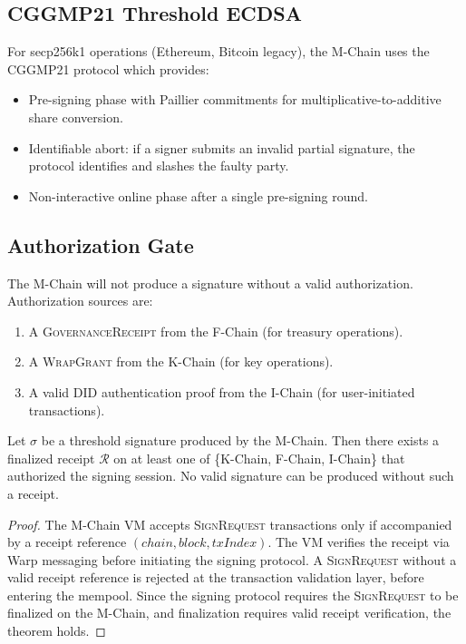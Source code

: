 \subsection{CGGMP21 Threshold ECDSA}

For secp256k1 operations (Ethereum, Bitcoin legacy), the M-Chain uses the CGGMP21
protocol \cite{lux-mchain-mpc} which provides:
\begin{itemize}
    \item Pre-signing phase with Paillier commitments for multiplicative-to-additive
          share conversion.
    \item Identifiable abort: if a signer submits an invalid partial signature, the
          protocol identifies and slashes the faulty party.
    \item Non-interactive online phase after a single pre-signing round.
\end{itemize}

\subsection{Authorization Gate}

The M-Chain will not produce a signature without a valid authorization. Authorization
sources are:

\begin{enumerate}
    \item A \textsc{GovernanceReceipt} from the F-Chain (for treasury operations).
    \item A \textsc{WrapGrant} from the K-Chain (for key operations).
    \item A valid DID authentication proof from the I-Chain (for user-initiated
          transactions).
\end{enumerate}

\begin{theorem}\label{thm:signing-auth}
Let $\sigma$ be a threshold signature produced by the M-Chain. Then there exists
a finalized receipt $\mathcal{R}$ on at least one of \{K-Chain, F-Chain, I-Chain\}
that authorized the signing session. No valid signature can be produced without
such a receipt.
\end{theorem}

\begin{proof}
The M-Chain VM accepts \textsc{SignRequest} transactions only if accompanied by
a receipt reference $(chain, block, txIndex)$. The VM verifies the receipt via
Warp messaging \cite{lux-warp-messaging} before initiating the signing protocol.
A \textsc{SignRequest} without a valid receipt reference is rejected at the
transaction validation layer, before entering the mempool. Since the signing
protocol requires the \textsc{SignRequest} to be finalized on the M-Chain,
and finalization requires valid receipt verification, the theorem holds.
\end{proof}

